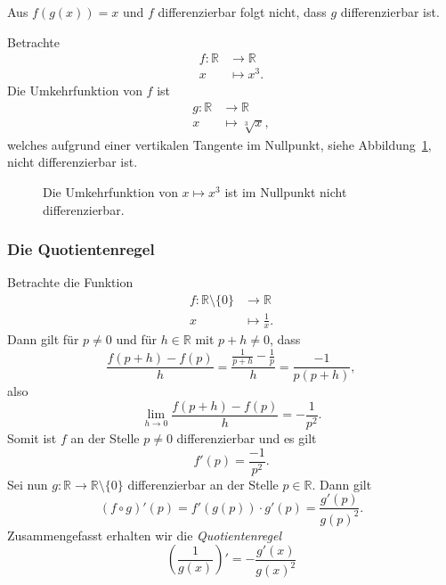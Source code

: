 \documentclass[../main.tex]{subfiles}
\begin{document}
\begin{warning}
  Aus $f(g(x)) = x$ und $f$ differenzierbar
  folgt nicht, dass $g$ differenzierbar ist.
\end{warning}

\begin{example}
  Betrachte
  \begin{align*}
    f \colon \mathbb{R} & \to \mathbb{R} \\
    x & \mapsto x^3.
  \end{align*}
  Die Umkehrfunktion von $f$ ist
  \begin{align*}
    g \colon \mathbb{R} & \to \mathbb{R} \\
    x & \mapsto \sqrt[3]{x},
  \end{align*}
  welches aufgrund einer vertikalen Tangente im
  Nullpunkt, siehe Abbildung~\ref{fig:cube},
  nicht differenzierbar ist.
  
\end{example}

\begin{figure}[htb] 
  \centering
  \begin{minipage}{0.40\textwidth}
    \centering
    
  \end{minipage}%
  \begin{minipage}{0.40\textwidth}
    \centering
    
  \end{minipage}%
  \caption{Die Umkehrfunktion von $x \mapsto x^3$
  ist im Nullpunkt nicht differenzierbar.}%
  \label{fig:cube}
\end{figure}

\subsubsection*{Die Quotientenregel}
Betrachte die Funktion
\begin{align*}
  f \colon \mathbb{R} \setminus \{0\} & \to \mathbb{R} \\
  x & \mapsto \frac{1}{x}.
\end{align*}
Dann gilt für 
$p \neq 0$ und für $h \in \mathbb{R}$ mit $p + h \neq 0$, dass
\[
  \frac{f(p+h) - f(p)}{h} = \frac{\frac{1}{p+h} - \frac{1}{p}}{h}
  = \frac{-1}{p(p+h)},
\]
also
\[
  \lim_{h \to 0} \frac{f(p+h) - f(p)}{h} = - \frac{1}{p^2}.
\]
Somit ist $f$ an der Stelle
$p \neq 0$ differenzierbar und es gilt
\[
  f'(p) = \frac{-1}{p^2}.
\]
Sei nun $g \colon \mathbb{R} \to \mathbb{R} \setminus \{0\}$ 
differenzierbar an der Stelle $p \in \mathbb{R}$.
Dann gilt
\[
  (f \circ g)'(p) = f'(g(p)) \cdot g'(p)
  = \frac{g'(p)}{{g(p)}^2}.
\]
Zusammengefasst erhalten wir die \emph{Quotientenregel}
\[
  \left( \frac{1}{g(x)} \right)' = -\frac{g'(x)}{{g(x)}^2}
\]
\end{document}
